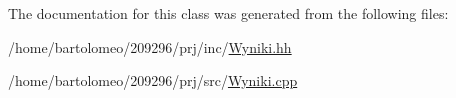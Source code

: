 The documentation for this class was generated from the following files\-:\begin{DoxyCompactItemize}
\item 
/home/bartolomeo/209296/prj/inc/\hyperlink{_wyniki_8hh}{Wyniki.\-hh}\item 
/home/bartolomeo/209296/prj/src/\hyperlink{_wyniki_8cpp}{Wyniki.\-cpp}\end{DoxyCompactItemize}
